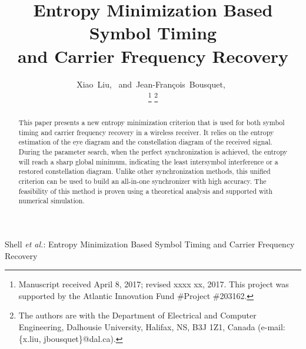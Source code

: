 \documentclass[journal,comsoc]{IEEEtran}
\begin{document}
%

\title{Entropy Minimization Based Symbol Timing
\\and Carrier Frequency Recovery}
\author{Xiao~Liu,~
        and~Jean-Fran\c{c}ois~Bousquet,~%

\thanks{Manuscript received April 8, 2017; revised xxxx xx, 2017. This project was supported by the Atlantic Innovation Fund \#Project \#203162.}
\thanks{The authors are with the Department of Electrical and Computer Engineering, Dalhousie University, Halifax,
NS, B3J 1Z1, Canada (e-mail: \{x.liu, jbousquet\}@dal.ca).}%
}

%
{Shell \MakeLowercase{\textit{et al.}}: Entropy Minimization Based Symbol Timing and Carrier Frequency Recovery}

\maketitle


\begin{abstract}
This paper  presents a new entropy minimization criterion that is used for both symbol timing and carrier frequency recovery in a wireless receiver.
It relies on the entropy estimation of the eye diagram and the constellation diagram of the received signal. 
During the parameter search, when the perfect synchronization is achieved, the entropy will reach a sharp global minimum, indicating the least intersymbol interference or a restored constellation diagram. 
Unlike other synchronization methods, this unified criterion can be used to build an all-in-one synchronizer with high accuracy.
The feasibility of this method is proven using a theoretical analysis and supported with numerical simulation. 
\end{abstract}
\end{document}
